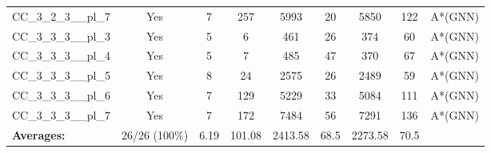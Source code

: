 \documentclass{article}
\begin{document}
\begin{tabular}{lcccccccc}
CC\_3\_2\_3\_\_pl\_7 & Yes & 7 & 257 & 5993 & 20 & 5850 & 122 & A*(GNN) \\
CC\_3\_3\_3\_\_pl\_3 & Yes & 5 & 6 & 461 & 26 & 374 & 60 & A*(GNN) \\
CC\_3\_3\_3\_\_pl\_4 & Yes & 5 & 7 & 485 & 47 & 370 & 67 & A*(GNN) \\
CC\_3\_3\_3\_\_pl\_5 & Yes & 8 & 24 & 2575 & 26 & 2489 & 59 & A*(GNN) \\
CC\_3\_3\_3\_\_pl\_6 & Yes & 7 & 129 & 5229 & 33 & 5084 & 111 & A*(GNN) \\
CC\_3\_3\_3\_\_pl\_7 & Yes & 7 & 172 & 7484 & 56 & 7291 & 136 & A*(GNN) \\
\textbf{Averages:} & 26/26 (100\%) & 6.19 & 101.08 & 2413.58 & 68.5 & 2273.58 & 70.5 & \\
\bottomrule
\end{tabular}
\\[0.7cm]
\end{document}
